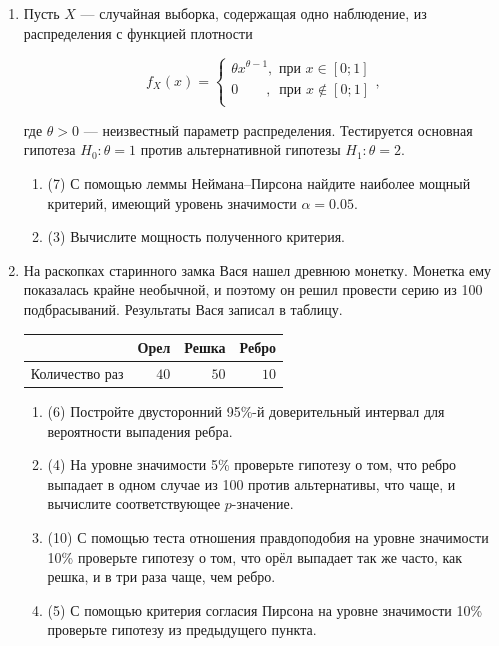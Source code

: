 \begin{enumerate}


\item Пусть $X$ — случайная выборка, содержащая одно наблюдение, из распределения с функцией плотности

\[
f_X(x) =
	\begin{cases}
	\theta x^{\theta-1},\text{ при }  x \in [0; 1] \\
	0\quad \quad \text{, }\text{ при } x \notin  [0; 1] \\
	\end{cases},
\]

где $\theta>0$ — неизвестный параметр распределения. Тестируется основная гипотеза $H_{0}:\theta=1$ против альтернативной гипотезы $H_{1}:\theta=2$.

\begin{enumerate}
    \item (7) С помощью леммы Неймана–Пирсона найдите наиболее мощный критерий, имеющий уровень значимости $\alpha=0.05$.
    \item (3) Вычислите мощность полученного критерия.
\end{enumerate}


\item На раскопках старинного замка Вася нашел древнюю монетку. Монетка ему показалась крайне необычной, и поэтому он решил провести серию из 100 подбрасываний. Результаты Вася записал в таблицу.

\begin{center}\begin{tabular}{rrrr}
\toprule
   & Орел   & Решка & Ребро  \\ \midrule
Количество раз &   $40$ & $50$ & $10$ \\ \bottomrule
\end{tabular}\end{center}
\begin{enumerate}
    \item (6) Постройте двусторонний 95\%-й доверительный интервал для вероятности выпадения ребра.
    \item (4) На уровне значимости 5\% проверьте гипотезу о том, что ребро выпадает в одном случае из 100 против альтернативы, что чаще, и вычислите соответствующее $p$-значение.
    \item (10) С помощью теста отношения правдоподобия на уровне значимости 10\% проверьте гипотезу о том, что орёл выпадает так же часто, как решка, и в три раза чаще, чем ребро.
    \item (5) С помощью критерия согласия Пирсона на уровне значимости 10\% проверьте гипотезу из предыдущего пункта.
\end{enumerate}


\end{enumerate}

